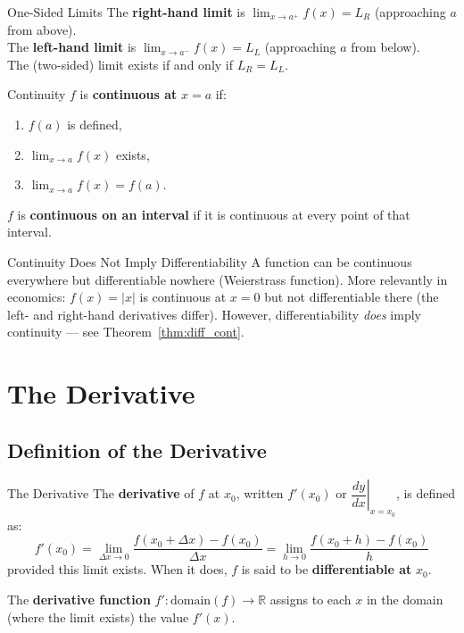 \documentclass[12pt, a4paper]{article}
\theoremstyle{definition}
\newcommand{\R}{\mathbb{R}}
\newcommand{\limit}[2]{\lim_{#1 \to #2}}
\begin{document}
\begin{defbox}{One-Sided Limits}
The \textbf{right-hand limit} is $\displaystyle\limit{x}{a^+}f(x) = L_R$
(approaching $a$ from above).\\
The \textbf{left-hand limit} is $\displaystyle\limit{x}{a^-}f(x) = L_L$
(approaching $a$ from below).\\
The (two-sided) limit exists if and only if $L_R = L_L$.
\end{defbox}

\begin{defbox}{Continuity}
$f$ is \textbf{continuous at} $x = a$ if:
\begin{enumerate}[label=(\roman*)]
  \item $f(a)$ is defined,
  \item $\displaystyle\limit{x}{a}f(x)$ exists,
  \item $\displaystyle\limit{x}{a}f(x) = f(a)$.
\end{enumerate}
$f$ is \textbf{continuous on an interval} if it is continuous at every point of
that interval.
\end{defbox}

\begin{warnbox}{Continuity Does Not Imply Differentiability}
A function can be continuous everywhere but differentiable nowhere (Weierstrass
function).  More relevantly in economics: $f(x) = |x|$ is continuous at $x=0$
but not differentiable there (the left- and right-hand derivatives differ).
However, differentiability \emph{does} imply continuity --- see Theorem~\ref{thm:diff_cont}.
\end{warnbox}

\section{The Derivative}

\subsection{Definition of the Derivative}

\begin{defbox}{The Derivative}
The \textbf{derivative} of $f$ at $x_0$, written $f'(x_0)$ or
$\left.\dfrac{dy}{dx}\right|_{x=x_0}$, is defined as:
\[
  f'(x_0)
  = \limit{\Delta x}{0} \frac{f(x_0+\Delta x) - f(x_0)}{\Delta x}
  = \limit{h}{0} \frac{f(x_0+h) - f(x_0)}{h}
\]
provided this limit exists.  When it does, $f$ is said to be
\textbf{differentiable at} $x_0$.

The \textbf{derivative function} $f': \text{domain}(f) \to \R$ assigns to
each $x$ in the domain (where the limit exists) the value $f'(x)$.
\end{defbox}
\end{document}
